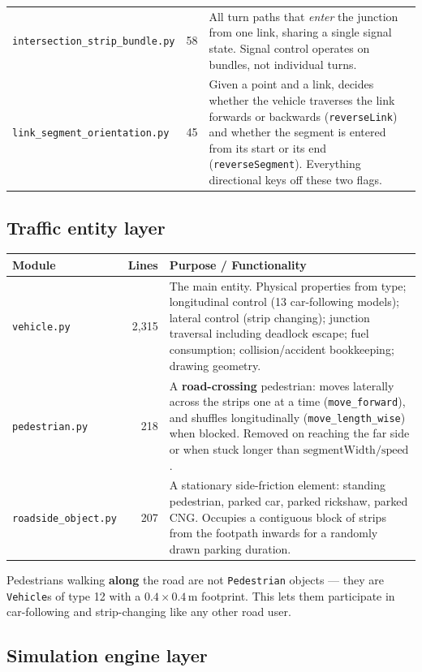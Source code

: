 \documentclass[11pt, a4paper]{article}
\newcommand{\code}[1]{\texttt{#1}}
\begin{document}
\begin{tabularx}{\textwidth}{l r X}
\code{intersection\_strip\_bundle.py} & 58 & All turn paths that \emph{enter} the junction from one link, sharing a single signal state. Signal control operates on bundles, not individual turns. \\
\code{link\_segment\_orientation.py} & 45 & Given a point and a link, decides whether the vehicle traverses the link forwards or backwards (\code{reverseLink}) and whether the segment is entered from its start or its end (\code{reverseSegment}). Everything directional keys off these two flags. \\
\bottomrule
\end{tabularx}

\subsection{Traffic entity layer}

\begin{tabularx}{\textwidth}{l r X}
\toprule
\textbf{Module} & \textbf{Lines} & \textbf{Purpose / Functionality} \\
\midrule
\code{vehicle.py} & 2{,}315 & The main entity. Physical properties from type; longitudinal control (13 car-following models); lateral control (strip changing); junction traversal including deadlock escape; fuel consumption; collision/accident bookkeeping; drawing geometry. \\
\code{pedestrian.py} & 218 & A \textbf{road-crossing} pedestrian: moves laterally across the strips one at a time (\code{move\_forward}), and shuffles longitudinally (\code{move\_length\_wise}) when blocked. Removed on reaching the far side or when stuck longer than $\text{segmentWidth}/\text{speed}$. \\
\code{roadside\_object.py} & 207 & A stationary side-friction element: standing pedestrian, parked car, parked rickshaw, parked CNG. Occupies a contiguous block of strips from the footpath inwards for a randomly drawn parking duration. \\
\bottomrule
\end{tabularx}

\medskip
Pedestrians walking \textbf{along} the road are not \code{Pedestrian} objects ---
they are \code{Vehicle}s of type 12 with a $0.4 \times 0.4$\,m footprint. This
lets them participate in car-following and strip-changing like any other road
user.

\subsection{Simulation engine layer}
\end{document}
